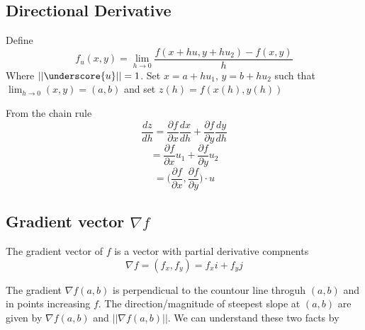 \subsection{Directional Derivative}
Define 
$$ f_u (x,y) = \lim_{h \to 0}  \frac{f(x+hu, y+hu_2) - f(x,y)}{h} $$
Where $ ||\underscore{u}||=  1 $. Set $ x = a + hu_1 $, $ y = b + hu_2 $ such that
$ \displaystyle \lim_{h \to 0} (x,y) = (a,b) $ and set $ z(h) = f(x(h), y(h)) $
\par
From the chain rule
$$ \frac{dz}{dh} = \frac{\partial f}{\partial x} \frac{dx}{dh} + \frac{\partial
f}{\partial y} \frac{dy}{dh} $$
$$ = \frac{\partial f}{\partial x} u_1 + \frac{\partial f}{\partial y} u_2 $$
$$ = \Big ( \frac{\partial f}{\partial x}, \frac{\partial f}{\partial y} \Big
  ) \cdot u $$
  \begin{center}
  \end{center}
   \subsection{Gradient vector $\nabla f $}
 The gradient vector of $ f $ is a vector with partial derivative compnents 
 $$ \nabla f = (f_x, f_y) = f_x i + f_y j $$
\begin{center}
\end{center}
The gradient $ \nabla f(a,b) $ is perpendicual to the countour line throguh
$ (a,b) $ and in points increasing $ f $. The direction/magnitude of steepest
slope at $ (a,b) $ are given by $ \nabla f(a,b) $ and $ ||\nabla f(a,b)|| $. We can understand these two facts by
